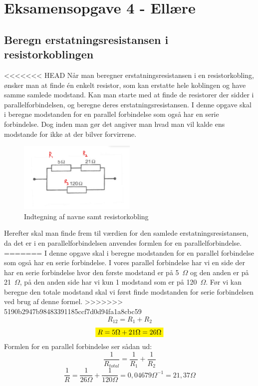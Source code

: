 \newpage
\section{Eksamensopgave 4 - Ellære}
\subsection{Beregn erstatningsresistansen i resistorkoblingen}
<<<<<<< HEAD
Når man beregner erstatningsresistansen i en resistorkobling, ønsker man at finde én enkelt resistor, som kan erstatte hele koblingen og have samme samlede modstand. Kan man starte med at finde de resistorer der sidder i parallelforbindelsen, og beregne deres erstatningsresistansen. 
I denne opgave skal i beregne modstanden for en parallel forbindelse som også har en serie forbindelse. Dog inden man gør det angiver man hvad man vil kalde ens modstande for ikke at der bilver forvirrene.
\begin{figure}[h!]
    \centering
    \includegraphics[width=0.5\textwidth]{figures/resistans.png}
    \caption{Indtegning af navne samt resistorkobling}
\end{figure}
Herefter skal man finde frem til værdien for den samlede erstatningsresistansen, da det er i en parallelforbindelsen anvendes formlen for en parallelforbindelse.
=======
I denne opgave skal i beregne modstanden for en parallel forbindelse som også har en serie forbindelse. I vores parallel forbindelse har vi en side der har en serie forbindelse hvor den første modstand er på 5~$\Omega$ og den anden er på 21~$\Omega$, på den anden side har vi kun 1 modstand som er på 120~$\Omega$.\newline
Før vi kan beregne den totale modstand skal vi først finde modstanden for serie forbindelsen ved brug af denne formel.
>>>>>>> 5190b2947b98483391185ccf7d0d94fa1a8cbc59
\begin{equation*}
    R_{12}=R_{1}+R_{2}
\end{equation*}
\begin{equation*}
    \mathcolorbox{yellow}{R=5\Omega+21\Omega=26\Omega}
\end{equation*}
Formlen for en parallel forbindelse ser sådan ud:
\begin{equation*}
    \frac{1}{R_{total}}=\frac{1}{R_{1}}+\frac{1}{R_{2}}
\end{equation*}
\begin{equation*}
    \frac{1}{R}=\frac{1}{26\Omega}+\frac{1}{120\Omega}=0,04679\Omega^{-1}=21,37\Omega
\end{equation*}

